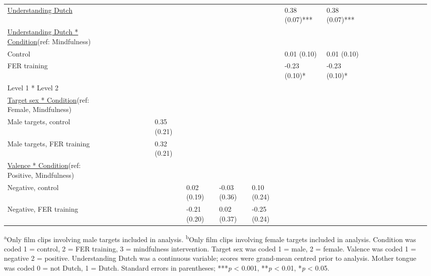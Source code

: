 \documentclass[authordate, empirical]{jote-new-article}
\begin{document}
\begin{table}
\begin{tabularx}{\linewidth}{@{} l l l l l l l l l l l l l l l l l l l l l l @{}}
         \underline{Understanding Dutch} &  &  &  &  &  &  &  &  &  &  & 0.38 (0.07)***
        & 0.38 (0.07)*** \\

         \underline{Understanding Dutch * Condition}(ref: Mindfulness) &  &  &  &
        &  &  &  &  &  &  &  &  \\

         Control &  &  &  &  &  &  &  &  &  &  & 0.01 (0.10) & 0.01 (0.10) \\

         FER training &  &  &  &  &  &  &  &  &  &  & -0.23 (0.10)* &
        -0.23 (0.10)* \\

        \hline Level 1 * Level 2 &  &  &  &  &  &  &  &  &  &  &  &  \\

        \hline \underline{Target sex * Condition}(ref: Female, Mindfulness) &  &  &

        &  &  &  &  &  &  &  &  &  \\

         Male targets, control &  &  &  &  &  &  & 0.35 (0.21) &  &  &  &  &  \\

         Male targets, FER training &  &  &  &  &  &  & 0.32 (0.21) &  &  &  &  &
         \\

         \underline{Valence * Condition}(ref: Positive, Mindfulness) &  &  &  &  &
         &  &  &  &  &  &  &  \\

         Negative, control &  &  &  &  &  &  &  & 0.02 (0.19) & -0.03 (0.36) & 0.10 (0.24)
        &  &  \\

         Negative, FER training &  &  &  &  &  &  &  & -0.21 (0.20) & 0.02 (0.37)
        & -0.25 (0.24) &  &  \\


    \end{tabularx}
\end{table}





\textsuperscript{a}Only film clips involving male targets included in analysis. \textsuperscript{b}Only film clips involving female targets included in analysis. Condition was coded 1 = control, 2 = FER training, 3 = mindfulness intervention. Target sex was coded 1 = male, 2 = female. Valence was coded 1 = negative 2 = positive. Understanding Dutch was a continuous variable; scores were grand-mean centred prior to analysis. Mother tongue was coded 0 = not Dutch, 1 = Dutch. Standard errors in parentheses; ***\emph{p} < 0.001, **\emph{p} < 0.01, *\emph{p} < 0.05.
\end{document}
